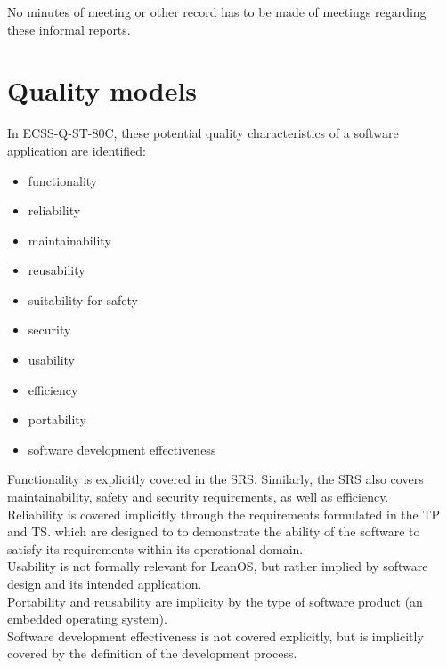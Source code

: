 \noindent
No minutes of meeting or other record has to be made of meetings regarding
these informal reports.


\section{Quality models}

In ECSS-Q-ST-80C\cite{ECSS80C}, these potential quality characteristics of a
software application are identified:

\begin{multicols}{2}
\begin{itemize}
	\item functionality
	\item reliability
	\item maintainability
	\item reusability
	\item suitability for safety
	\item security
	\item usability
	\item efficiency
	\item portability
	\item software development effectiveness
\end{itemize}
\end{multicols}

\noindent
Functionality is explicitly covered in the \gls{SRS}\cite{leanosSRS}. Similarly,
the \gls{SRS} also covers maintainability, safety and security requirements, as
well as efficiency.\\

\noindent
Reliability is covered implicitly through the requirements formulated in the
\gls{TP}\cite{leanosTP} and \gls{TS}\cite{leanosTS}. which are designed to
to demonstrate the ability of the software to satisfy its requirements within
its operational domain.\\

\noindent
Usability is not formally relevant for LeanOS, but rather implied by software
design and its intended application.\\

\noindent
Portability and reusability are implicity by the type of software product
(an embedded operating system).\\

\noindent
Software development effectiveness is not covered explicitly, but is implicitly
covered by the definition of the development process.


